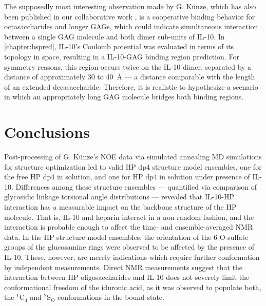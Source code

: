 The supposedly most interesting observation made by G. Künze, which has also
been published in our collaborative work \cite{kuenze_gehrcke_2014}, is a
cooperative binding behavior for octasaccharides and longer GAGs, which could
indicate simultaneous interaction between a single GAG molecule and both dimer
sub-units of IL-10.  In \cref{chapter:bspred}, IL-10's Coulomb potential was
evaluated in terms of its topology in space, resulting in a IL-10-GAG binding
region prediction. For symmetry reasons, this region occurs twice on the IL-10
dimer, separated by a distance of approximately 30 to \SI{40}{\angstrom} --- a
distance comparable with the length of an extended decasaccharide. Therefore, it
is realistic to hypothesize a scenario in which an appropriately long GAG
molecule bridges both binding regions.





\section{Conclusions}
Post-processing of G. Künze's NOE data via simulated annealing MD simulations
for structure optimization led to valid HP dp4 structure model ensembles, one
for the free HP dp4 in solution, and one for HP dp4 in solution under presence
of IL-10. Differences among these structure ensembles --- quantified via
comparison of glycosidic linkage torsional angle distributions --- revealed that
IL-10-HP interaction has a measurable impact on the backbone structure of the HP
molecule. That is, IL-10 and heparin interact in a non-random fashion, and the
interaction is probable enough to affect the time- and ensemble-averaged NMR
data. In the HP structure model ensembles, the orientation of the 6-O-sulfate
groups of the glucosamine rings were observed to be affected by the presence of
IL-10. These, however, are merely indications which require further
conformation by independent measurements. Direct NMR measurements suggest that
the interaction between HP oligosaccharides and IL-10 does not severely limit
the conformational freedom of the iduronic acid, as it was observed to populate
both, the ${}^1$C${}_4$ and ${}^2$S${}_\mathrm{O}$ conformations in the bound
state.

